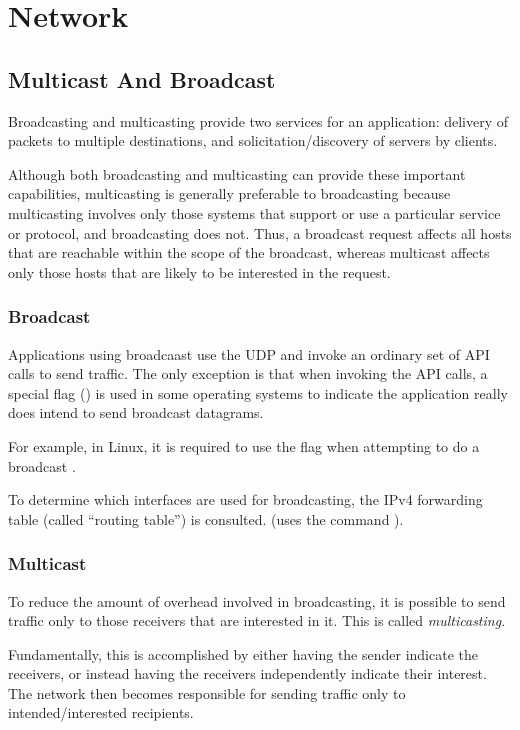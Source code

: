 \chapter{Network}

\section{Multicast And Broadcast}

Broadcasting and multicasting provide two services for an application: delivery of packets to multiple destinations, and solicitation/discovery of servers by clients.

Although both broadcasting and multicasting can provide these important
capabilities, multicasting is generally preferable to broadcasting because multicasting involves only those systems that support or use a particular service or protocol, and broadcasting does not. Thus, a broadcast request affects all hosts that are reachable within the scope of the broadcast, whereas multicast affects only those hosts that are likely to be interested in the request. 

\subsection{Broadcast}
Applications using broadcaast use the UDP and invoke an ordinary set of API calls to send traffic. The only exception is that when invoking the API calls, a special flag () is used in some operating systems to indicate the application really does intend to send broadcast datagrams. 

For example, in Linux, it is required to use the  flag when attempting to do a broadcast .

To determine which interfaces are used for broadcasting, the IPv4 forwarding table (called ``routing table'') is consulted. (uses the command ).

\subsection{Multicast}
To reduce the amount of overhead involved in broadcasting, it is possible to send traffic only to those receivers that are interested in it. This is called \textit{multicasting}.

Fundamentally, this is accomplished by either having the sender indicate the
receivers, or instead having the receivers independently indicate their interest. The network then becomes responsible for sending traffic only to intended/interested recipients.

